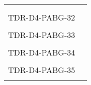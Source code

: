 \begin{longtable}{|p{2cm}|p{12cm}|@{}}
\begin{minipage}{12cm}
\end{minipage}\\
\\
\hline 
TDR-D4-PABG-32&
\begin{minipage}{12cm}
\end{minipage}\\
\\
\hline  
TDR-D4-PABG-33&
\begin{minipage}{12cm}
\end{minipage}\\
\\
\hline  
TDR-D4-PABG-34&
\begin{minipage}{12cm}
\end{minipage}\\
\\
\hline  
TDR-D4-PABG-35&
\begin{minipage}{12cm}
\end{minipage}\\
\\
\hline 
\end{longtable}
\normalsize

\clearpage